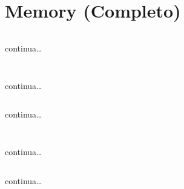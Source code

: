 \section[Memory]{Memory (Completo)}


\begin{frame}[fragile]\transfade
  \begin{sol}\centering
    \inputminted[lastline=18]{html}{memory/js/memory.html}
    continua\dots
  \end{sol}
\end{frame}
\begin{frame}[fragile]\transfade
  \begin{sol}\centering
    \inputminted[firstline=20,breaklines,fontsize=\tiny]{html}{memory/js/memory.html}
  \end{sol}
\end{frame}


\begin{frame}[fragile]\transfade
  \begin{sol}\centering
    \inputminted[breaklines, lastline=21]{css}{memory/js/memory.css}
    continua\dots
  \end{sol}
\end{frame}
\begin{frame}[fragile]\transfade
  \begin{sol}\centering
    \inputminted[breaklines, firstline=23, lastline=44]{css}{memory/js/memory.css}
    continua\dots
  \end{sol}
\end{frame}
\begin{frame}[fragile]\transfade
  \begin{sol}\centering
    \inputminted[breaklines, firstline=45]{css}{memory/js/memory.css}
  \end{sol}
\end{frame}

\begin{frame}[fragile]\transfade
  \begin{sol}\centering
    \inputminted[breaklines, lastline=30,fontsize=\tiny]{js}{memory/js/memory.js}
    continua\dots
  \end{sol}
\end{frame}
\begin{frame}[fragile]\transfade
  \begin{sol}\centering
    \inputminted[breaklines, firstline=33, lastline=60,fontsize=\tiny]{js}{memory/js/memory.js}
    continua\dots
  \end{sol}
\end{frame}

